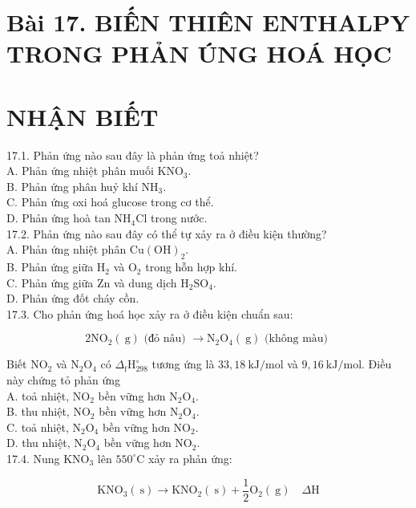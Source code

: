 \documentclass[10pt]{article}
\begin{document}
\section*{Bài 17. BIẾN THIÊN ENTHALPY TRONG PHẢN ÚNG HOÁ HỌC}
\section*{NHẬN BIẾT}
17.1. Phản ứng nào sau đây là phản ứng toả nhiệt?\\
A. Phản ứng nhiệt phân muối $\mathrm{KNO}_{3}$.\\
B. Phản ứng phân huỷ khí $\mathrm{NH}_{3}$.\\
C. Phản ứng oxi hoá glucose trong cơ thể.\\
D. Phản ứng hoà tan $\mathrm{NH}_{4} \mathrm{Cl}$ trong nước.\\
17.2. Phản ứng nào sau đây có thể tự xảy ra ở điều kiện thường?\\
A. Phản ứng nhiệt phân $\mathrm{Cu}(\mathrm{OH})_{2}$.\\
B. Phản ứng giữa $\mathrm{H}_{2}$ và $\mathrm{O}_{2}$ trong hỗn hợp khí.\\
C. Phản ứng giữa Zn và dung dịch $\mathrm{H}_{2} \mathrm{SO}_{4}$.\\
D. Phản ứng đốt cháy cồn.\\
17.3. Cho phản ứng hoá học xảy ra ở điều kiện chuẩn sau:

$$
2 \mathrm{NO}_{2}(\mathrm{~g}) \text { (đỏ nâu) } \rightarrow \mathrm{N}_{2} \mathrm{O}_{4}(\mathrm{~g}) \text { (không màu) }
$$

Biết $\mathrm{NO}_{2}$ và $\mathrm{N}_{2} \mathrm{O}_{4}$ có $\Delta_{\mathrm{f}} \mathrm{H}_{298}^{\circ}$ tương ứng là $33,18 \mathrm{~kJ} / \mathrm{mol}$ và $9,16 \mathrm{~kJ} / \mathrm{mol}$. Điều này chứng tỏ phản ứng\\
A. toả nhiệt, $\mathrm{NO}_{2}$ bền vững hơn $\mathrm{N}_{2} \mathrm{O}_{4}$.\\
B. thu nhiệt, $\mathrm{NO}_{2}$ bền vững hơn $\mathrm{N}_{2} \mathrm{O}_{4}$.\\
C. toả nhiệt, $\mathrm{N}_{2} \mathrm{O}_{4}$ bền vững hơn $\mathrm{NO}_{2}$.\\
D. thu nhiệt, $\mathrm{N}_{2} \mathrm{O}_{4}$ bền vững hơn $\mathrm{NO}_{2}$.\\
17.4. Nung $\mathrm{KNO}_{3}$ lên $550^{\circ} \mathrm{C}$ xảy ra phản ứng:

$$
\mathrm{KNO}_{3}(\mathrm{~s}) \rightarrow \mathrm{KNO}_{2}(\mathrm{~s})+\frac{1}{2} \mathrm{O}_{2}(\mathrm{~g}) \quad \Delta \mathrm{H}
$$
\end{document}
